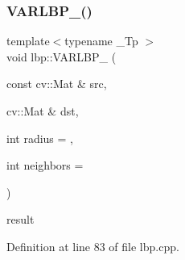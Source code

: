 \subsubsection{\texorpdfstring{VARLBP\_()}{VARLBP\_()}}
{\footnotesize\ttfamily template$<$typename \+\_\+\+Tp $>$ \\
void lbp\+::\+V\+A\+R\+L\+B\+P\+\_\+ (\begin{DoxyParamCaption}\item[{const cv\+::\+Mat \&}]{src,  }\item[{cv\+::\+Mat \&}]{dst,  }\item[{int}]{radius = {},  }\item[{int}]{neighbors = {} }\end{DoxyParamCaption})}

result 

Definition at line 83 of file lbp.\+cpp.


